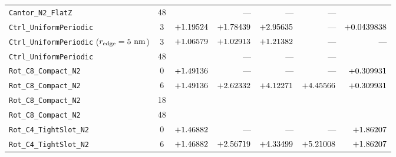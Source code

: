 \begin{table}[!htbp]
{\begin{tabular}{lcrrrrr}
\texttt{Cantor\_N2\_FlatZ} & 48 & \CantorNtwoFlatzBemThetafoureightFZPn{} & --- & --- & --- & \CantorNtwoFlatzMeepThetafoureightFZPn{} \\
\texttt{Ctrl\_UniformPeriodic} & 3 & $+1.19524{}$ & $+1.78439{}$ & $+2.95635{}$ & --- & $+0.0439838{}$ \\
\texttt{Ctrl\_UniformPeriodic} ($r_{\rm edge}=5\text{ nm}$) & 3 & $+1.06579{}$ & $+1.02913{}$ & $+1.21382{}$ & --- & --- \\
\texttt{Ctrl\_UniformPeriodic} & 48 & \CtrlUniformperiodicBemThetafoureightFZPn{} & --- & --- & --- & \CtrlUniformperiodicMeepThetafoureightFZPn{} \\
\texttt{Rot\_C8\_Compact\_N2} & 0 & $+1.49136{}$ & --- & --- & --- & $+0.309931{}$ \\
\texttt{Rot\_C8\_Compact\_N2} & 6 & $+1.49136{}$ & $+2.62332{}$ & $+4.12271{}$ & $+4.45566{}$ & $+0.309931{}$ \\
\texttt{Rot\_C8\_Compact\_N2} & 18 & \RotCeightCompactNtwoStandardThetaZerooneeightpzeroVectorDyadicFZPn{} & \RotCeightCompactNtwoHighThetaZerooneeightpzeroVectorDyadicFZPn{} & \RotCeightCompactNtwoUltraHighThetaZerooneeightpzeroVectorDyadicFZPn{} & \RotCeightCompactNtwoHighThetaZerooneeightpzeroScalarYukawaFZPn{} & \RotCeightCompactNtwoMeepThetaoneeightFZPn{} \\
\texttt{Rot\_C8\_Compact\_N2} & 48 & \RotCeightCompactNtwoStandardThetaZerofoureightpzeroVectorDyadicFZPn{} & \RotCeightCompactNtwoHighThetaZerofoureightpzeroVectorDyadicFZPn{} & \RotCeightCompactNtwoUltraHighThetaZerofoureightpzeroVectorDyadicFZPn{} & \RotCeightCompactNtwoHighThetaZerofoureightpzeroScalarYukawaFZPn{} & \RotCeightCompactNtwoMeepThetafoureightFZPn{} \\
\texttt{Rot\_C4\_TightSlot\_N2} & 0 & $+1.46882{}$ & --- & --- & --- & $+1.86207{}$ \\
\texttt{Rot\_C4\_TightSlot\_N2} & 6 & $+1.46882{}$ & $+2.56719{}$ & $+4.33499{}$ & $+5.21008{}$ & $+1.86207{}$ \\

\end{tabular}}
\end{table}
